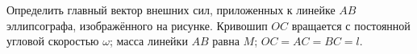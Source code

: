 Определить главный вектор внешних сил, приложенных к линейке $AB$ эллипсографа,
изображённого на рисунке.
Кривошип $OC$ вращается с постоянной угловой скоростью $\omega$;
масса линейки $AB$ равна $M$; $OC = AC = BC = l$.
